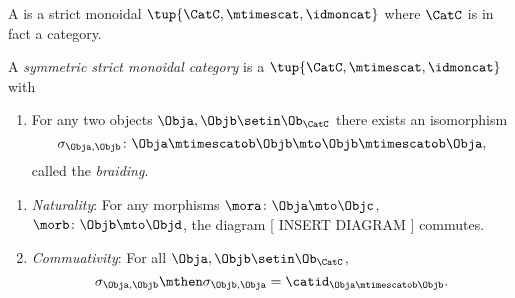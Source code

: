 \begin{ctdefinition}
    \label{def:strict-monoidal-category}
    A  is a strict monoidal  $\tup{\CatC, \mtimescat, \idmoncat}$ where $\CatC$ is in fact a category.
\end{ctdefinition}

\begin{ctdefinition}
    \label{def:sym-strict-monoidal-semicat}
    A \emph{symmetric strict monoidal category} is a  $\tup{\CatC, \mtimescat, \idmoncat}$ with

    \constit

    \begin{enumerate}
        \item For any two objects $\Obja, \Objb \setin \Ob_\CatC$ there exists an isomorphism
              \begin{equation}
                  \sigma_{\Obja, \Objb} \colon \Obja \mtimescatob \Objb \mto \Objb \mtimescatob \Obja,
              \end{equation}
              called the \emph{braiding}.
    \end{enumerate}

    \condit

    \begin{enumerate}
        \item \emph{Naturality}: For any morphisms $\mora \colon \Obja \mto \Objc$, $\morb \colon \Objb \mto \Objd$, the diagram
                  [ INSERT DIAGRAM ]
              commutes.
        \item \emph{Commuativity}: For all $\Obja, \Objb \setin \Ob_\CatC$,
              \begin{equation}
                  \sigma_{\Obja, \Objb} \mthen \sigma_{\Objb, \Obja} = \catid_{\Obja \mtimescatob \Objb}.
              \end{equation}
    \end{enumerate}

\end{ctdefinition}



